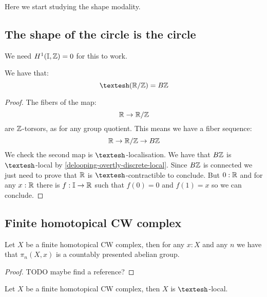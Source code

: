 Here we start studying the shape modality.

\subsection{The shape of the circle is the circle}

We need $H^1(\mathbb{I},\mathbb{Z}) = 0$ for this to work.

\begin{proposition}
We have that:
\[\shape (\R/\Z) = B\Z\]
\end{proposition}

\begin{proof}
The fibers of the map:
\[\mathbb{R}\to \mathbb{R}/\mathbb{Z}\]
are $\mathbb{Z}$-torsors, as for any group quotient. This means we have a fiber sequence:
\[\mathbb{R} \to \mathbb{R}/\mathbb{Z} \to B\mathbb{Z}\]
We check the second map is $\shape$-localisation. We have that $B\mathbb{Z}$ is $\shape$-local by \cref{delooping-overtly-discrete-local}. Since $B\mathbb{Z}$ is connected we just need to prove that $\mathbb{R}$ is $\shape$-contractible to conclude. But $0:\mathbb{R}$ and for any $x:\mathbb{R}$ there is $f:\mathbb{I}\to\mathbb{R}$ such that $f(0)=0$ and $f(1)=x$ so we can conclude.
\end{proof}

\subsection{Finite homotopical CW complex}

\begin{lemma}\label{finite-homotopy-groups-countably-presented}
Let $X$ be a finite homotopical CW complex, then for any $x:X$ and any $n$ we have that $\pi_n(X,x)$ is a countably presented abelian group.
\end{lemma}

\begin{proof}
TODO maybe find a reference?
\end{proof}

\begin{proposition}
Let $X$ be a finite homotopical CW complex, then $X$ is $\shape$-local.
\end{proposition}

